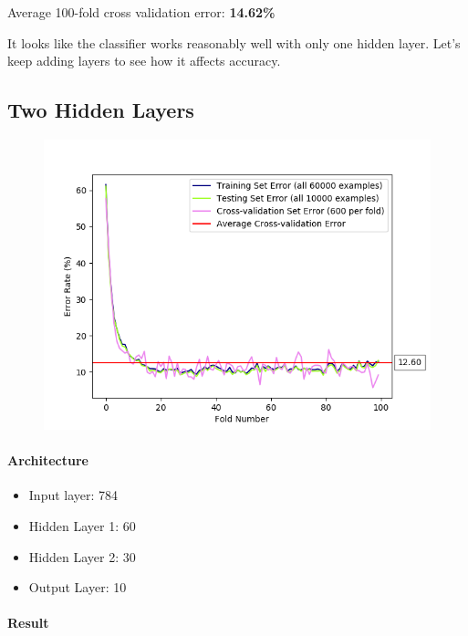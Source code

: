 \documentclass[11pt]{article}
\makeatletter
\def\maxwidth{\ifdim\Gin@nat@width>\linewidth\linewidth
    \else\Gin@nat@width\fi}
\let\Oldincludegraphics\includegraphics
\renewcommand{\includegraphics}[1]{\Oldincludegraphics[width=.8\maxwidth]{#1}}
\providecommand{\tightlist}{%
      \setlength{\itemsep}{0pt}\setlength{\parskip}{0pt}}
\makeatother
\begin{document}
Average 100-fold cross validation error: \textbf{14.62\%}

It looks like the classifier works reasonably well with only one
hidden layer. Let's keep adding layers to see how it affects accuracy.

\pagebreak

\subsection{Two Hidden Layers}\label{two-hidden-layers}

\begin{figure}[htbp]
\centering
\includegraphics{plots/ff-numlayers-60-30.png}
\end{figure}

\paragraph{Architecture}\label{architecture-2}

\begin{itemize}
\tightlist
\item
  Input layer: 784
\item
  Hidden Layer 1: 60
\item
  Hidden Layer 2: 30
\item
  Output Layer: 10
\end{itemize}

\paragraph{Result}\label{result-1}
\end{document}
